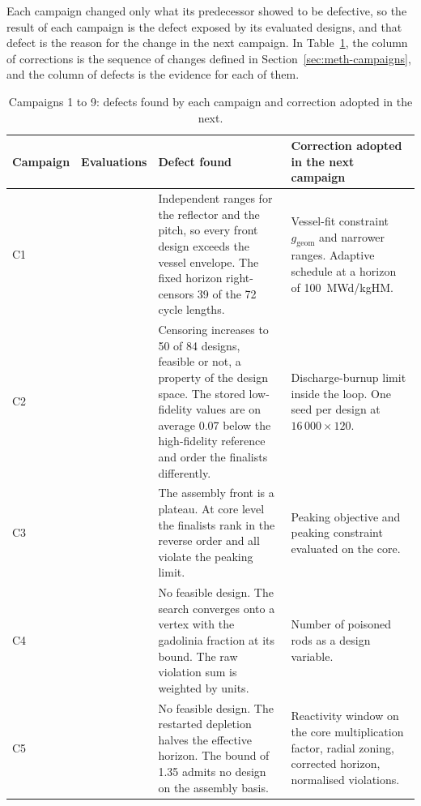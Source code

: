Each campaign changed only what its predecessor showed to be defective,
so the result of each campaign is the defect exposed by its evaluated
designs, and that defect is the reason for the change in the next
campaign. In Table~\ref{tab:campaign-history}, the column of corrections
is the sequence of changes defined in Section~\ref{sec:meth-campaigns},
and the column of defects is the evidence for each of them.

\begin{table}[htbp]
  \centering
  \footnotesize
  \caption{Campaigns 1 to 9: defects found by each campaign and correction adopted in the next.}
  \label{tab:campaign-history}
  \begin{tabularx}{\textwidth}{@{}>{\raggedright\arraybackslash}p{1.55cm}>{\centering\arraybackslash}p{1.85cm}>{\raggedright\arraybackslash}X>{\raggedright\arraybackslash}X@{}}
    \toprule
    Campaign & Evaluations & Defect found & Correction adopted in the next campaign \\
    \midrule
    C1 & 72 &
      Independent ranges for the reflector and the pitch, so every front design exceeds the vessel envelope. The fixed horizon right-censors 39 of the 72 cycle lengths. &
      Vessel-fit constraint $g_\mathrm{geom}$ and narrower ranges. Adaptive schedule at a horizon of \SI{100}{MWd/kgHM}. \\
    \addlinespace[3pt]
    C2 & 84 &
      Censoring increases to 50 of 84 designs, feasible or not, a property of the design space. The stored low-fidelity values are on average 0.07 below the high-fidelity reference and order the finalists differently. &
      Discharge-burnup limit inside the loop. One seed per design at $16\,000\times120$. \\
    \addlinespace[3pt]
    C3 & 72 &
      The assembly front is a plateau. At core level the finalists rank in the reverse order and all violate the peaking limit. &
      Peaking objective and peaking constraint evaluated on the core. \\
    \addlinespace[3pt]
    C4 & 54 &
      No feasible design. The search converges onto a vertex with the gadolinia fraction at its bound. The raw violation sum is weighted by units. &
      Number of poisoned rods as a design variable. \\
    \addlinespace[3pt]
    C5 & 60 &
      No feasible design. The restarted depletion halves the effective horizon. The bound of 1.35 admits no design on the assembly basis. &
      Reactivity window on the core multiplication factor, radial zoning, corrected horizon, normalised violations. \\

\end{tabularx}
\end{table}

